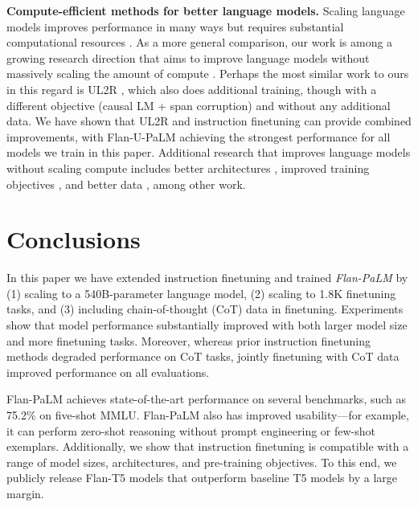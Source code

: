 \textbf{Compute-efficient methods for better language models.} Scaling language models improves performance in many ways but requires substantial computational resources \citep[][\textit{inter alia}]{kaplan2020scaling,brown2020language,bommasani2021opportunities,wei2022emergent}. As a more general comparison, our work is among a growing research direction that aims to improve language models without massively scaling the amount of compute \citep{hoffmann2022training, padmakumar2022exploring}. Perhaps the most similar work to ours in this regard is UL2R \citep{tay2022transcending}, which also does additional training, though with a different objective (causal LM + span corruption) and without any additional data. We have shown that UL2R and instruction finetuning can provide combined improvements, with Flan-U-PaLM achieving the strongest performance for all models we train in this paper. Additional research that improves language models without scaling compute includes better architectures \citep{so2021searching}, improved training objectives \citep{tay2022unifying}, and better data \citep{du_glam_2021}, among other work.

\section{Conclusions}
In this paper we have extended instruction finetuning and trained \textit{Flan-PaLM} by (1) scaling to a 540B-parameter language model, (2) scaling to 1.8K finetuning tasks, and (3) including chain-of-thought (CoT) data in finetuning. Experiments show that model performance substantially improved with both larger model size and more finetuning tasks. Moreover, whereas prior instruction finetuning methods degraded performance on CoT tasks, jointly finetuning with CoT data improved performance on all evaluations.

 Flan-PaLM achieves state-of-the-art performance on several benchmarks, such as 75.2\% on five-shot MMLU. Flan-PaLM also has improved usability---for example, it can perform zero-shot reasoning without prompt engineering or few-shot exemplars. Additionally, we show that instruction finetuning is compatible with a range of model sizes, architectures, and pre-training objectives. To this end, we publicly release Flan-T5 models that outperform baseline T5 models by a large margin.


